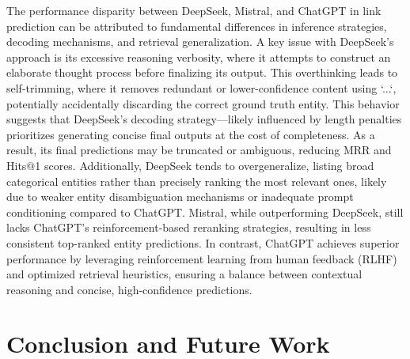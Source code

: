 \documentclass[12pt,a4paper]{article}
\begin{document}
The performance disparity between DeepSeek, Mistral, and ChatGPT in link prediction can be attributed to fundamental differences in inference strategies, decoding mechanisms, and retrieval generalization. A key issue with DeepSeek's approach is its excessive reasoning verbosity, where it attempts to construct an elaborate thought process before finalizing its output. This overthinking leads to self-trimming, where it removes redundant or lower-confidence content using `...`, potentially accidentally discarding the correct ground truth entity. This behavior suggests that DeepSeek's decoding strategy—likely influenced by length penalties prioritizes generating concise final outputs at the cost of completeness. As a result, its final predictions may be truncated or ambiguous, reducing MRR and Hits@1 scores. Additionally, DeepSeek tends to overgeneralize, listing broad categorical entities rather than precisely ranking the most relevant ones, likely due to weaker entity disambiguation mechanisms or inadequate prompt conditioning compared to ChatGPT. Mistral, while outperforming DeepSeek, still lacks ChatGPT's reinforcement-based reranking strategies, resulting in less consistent top-ranked entity predictions. In contrast, ChatGPT achieves superior performance by leveraging reinforcement learning from human feedback (RLHF) and optimized retrieval heuristics, ensuring a balance between contextual reasoning and concise, high-confidence predictions.

%
%


\section{Conclusion and Future Work}\label{sec:conclusion-and-future-work}


\end{document}
